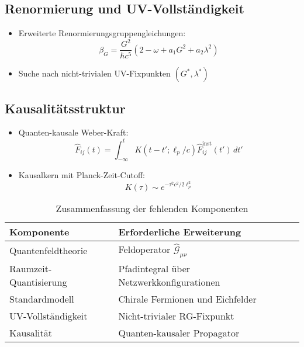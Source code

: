 \subsection{Renormierung und UV-Vollständigkeit}
\begin{itemize}
    \item Erweiterte Renormierungsgruppengleichungen:
    \begin{equation}
        \beta_G = \frac{G^2}{\hbar c^5}(2 - \omega + a_1G^2 + a_2\lambda^2)
    \end{equation}
    \item Suche nach nicht-trivialen UV-Fixpunkten $(G^*,\lambda^*)$
\end{itemize}

\subsection{Kausalitätsstruktur}
\begin{itemize}
    \item Quanten-kausale Weber-Kraft:
    \begin{equation}
        \hat{F}_{ij}(t) = \int_{-\infty}^t K(t-t';\ell_p/c)\hat{F}_{ij}^{\text{inst}}(t')\,dt'
    \end{equation}
    \item Kausalkern mit Planck-Zeit-Cutoff:
    \begin{equation}
        K(\tau) \sim e^{-\tau^2c^2/2\ell_p^2}
    \end{equation}
\end{itemize}

\begin{table}[h]
\centering
\caption{Zusammenfassung der fehlenden Komponenten}
\begin{tabular}{ll}
\toprule
\textbf{Komponente} & \textbf{Erforderliche Erweiterung} \\
\midrule
Quantenfeldtheorie & Feldoperator $\hat{\mathcal{G}}_{\mu\nu}$ \\
Raumzeit-Quantisierung & Pfadintegral über Netzwerkkonfigurationen \\
Standardmodell & Chirale Fermionen und Eichfelder \\
UV-Vollständigkeit & Nicht-trivialer RG-Fixpunkt \\
Kausalität & Quanten-kausaler Propagator \\
\bottomrule
\end{tabular}
\end{table}
